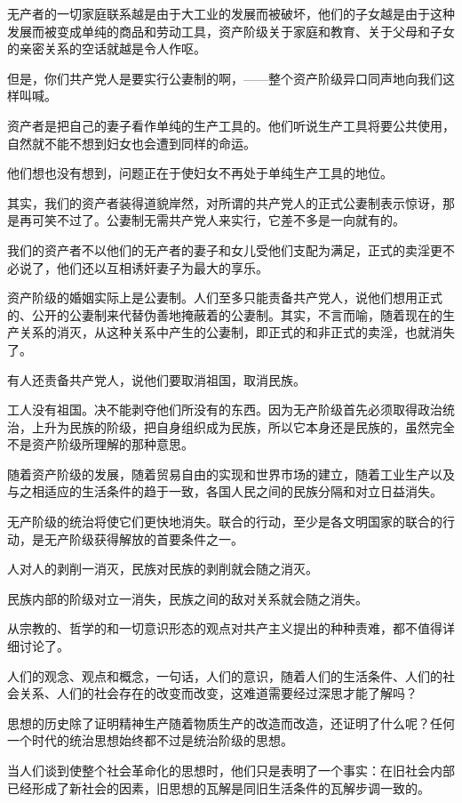 \documentclass[10pt, UTF8]{book} %
\begin{document}
无产者的一切家庭联系越是由于大工业的发展而被破坏，他们的子女越是由于这种发展而被变成单纯的商品和劳动工具，资产阶级关于家庭和教育、关于父母和子女的亲密关系的空话就越是令人作呕。

但是，你们共产党人是要实行公妻制的啊，——整个资产阶级异口同声地向我们这样叫喊。

资产者是把自己的妻子看作单纯的生产工具的。他们听说生产工具将要公共使用，自然就不能不想到妇女也会遭到同样的命运。

他们想也没有想到，问题正在于使妇女不再处于单纯生产工具的地位。

其实，我们的资产者装得道貌岸然，对所谓的共产党人的正式公妻制表示惊讶，那是再可笑不过了。公妻制无需共产党人来实行，它差不多是一向就有的。

我们的资产者不以他们的无产者的妻子和女儿受他们支配为满足，正式的卖淫更不必说了，他们还以互相诱奸妻子为最大的享乐。

资产阶级的婚姻实际上是公妻制。人们至多只能责备共产党人，说他们想用正式的、公开的公妻制来代替伪善地掩蔽着的公妻制。其实，不言而喻，随着现在的生产关系的消灭，从这种关系中产生的公妻制，即正式的和非正式的卖淫，也就消失了。

有人还责备共产党人，说他们要取消祖国，取消民族。

工人没有祖国。决不能剥夺他们所没有的东西。因为无产阶级首先必须取得政治统治，上升为民族的阶级，把自身组织成为民族，所以它本身还是民族的，虽然完全不是资产阶级所理解的那种意思。

随着资产阶级的发展，随着贸易自由的实现和世界市场的建立，随着工业生产以及与之相适应的生活条件的趋于一致，各国人民之间的民族分隔和对立日益消失。

无产阶级的统治将使它们更快地消失。联合的行动，至少是各文明国家的联合的行动，是无产阶级获得解放的首要条件之一。

人对人的剥削一消灭，民族对民族的剥削就会随之消灭。

民族内部的阶级对立一消失，民族之间的敌对关系就会随之消失。

从宗教的、哲学的和一切意识形态的观点对共产主义提出的种种责难，都不值得详细讨论了。

人们的观念、观点和概念，一句话，人们的意识，随着人们的生活条件、人们的社会关系、人们的社会存在的改变而改变，这难道需要经过深思才能了解吗？

思想的历史除了证明精神生产随着物质生产的改造而改造，还证明了什么呢？任何一个时代的统治思想始终都不过是统治阶级的思想。

当人们谈到使整个社会革命化的思想时，他们只是表明了一个事实：在旧社会内部已经形成了新社会的因素，旧思想的瓦解是同旧生活条件的瓦解步调一致的。
\end{document}
